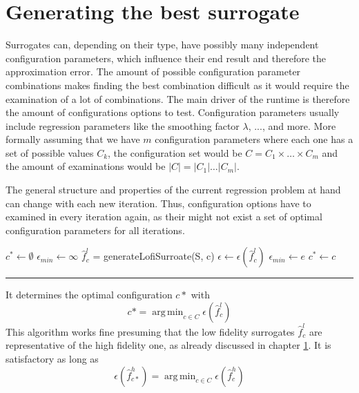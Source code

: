 \documentclass[
  a4paper,  %
  twoside,  %
  bibliography=totoc,
  headsepline,
  cleardoublepage=empty,
  parskip=half,
  draft=false
]{scrbook}
\DeclareMathOperator*{\argmin}{arg\,min}
\newcommand{\delimit}{{\color{charcoal}\noindent\rule{\textwidth}{1pt}}}
\begin{document}
\section{Generating the best surrogate}

Surrogates can, depending on their type, have possibly many independent configuration parameters, which influence their end result and therefore the approximation error.
The amount of possible configuration parameter combinations makes finding the best combination difficult as it would require the examination of a lot of combinations.
The main driver of the runtime is therefore the amount of configurations options to test.
Configuration parameters usually include regression parameters like the smoothing factor $\lambda$, ..., and more.
More formally assuming that we have $m$ configuration parameters where each one has a set of possible values $C_k$, the configuration set would be $C=C_1 \times \dots \times C_m$ and the amount of examinations would be $|C|=|C_1| \dots |C_m|$.

The general structure and properties of the current regression problem at hand can change with each new iteration.
Thus, configuration options have to examined in every iteration again, as their might not exist a set of optimal configuration 
parameters for all iterations.

\begin{mdframed}[style=algstyle,frametitle={\textbf{function} \texttt{generateBestSurroate}{$(S_t, C, \epsilon)$}}]
\normalsize
\vspace{5.5mm}
\begin{algorithmic}[1]
    \State $c^\ast \gets \emptyset$
    \State $\epsilon_{min} \gets \infty$
      \State $\hat{f}_c^l$ = generateLofiSurroate(S, c)
    	\State $\epsilon \gets \epsilon(\hat{f}_c^l)$
    	  \State $\epsilon_{min}\gets e$
    	\State $c^\ast \gets c$
    	\EndIf
    \EndFor
    \State {}
\end{algorithmic}
\vspace{-1.5mm}
\delimit
	\label{alg:bestsur}
\end{mdframed}


It determines the optimal configuration $c*$ with
\begin{equation}
c*=\argmin_{c \in C} \epsilon(\hat{f}_c^l)
\end{equation}
This algorithm works fine presuming that the low fidelity surrogates $\hat{f}_c^l$ are representative of the high fidelity one, as already discussed in chapter \ref{}.
It is satisfactory as long as 
\begin{equation}
\epsilon(\hat{f}_{c*}^h)=\argmin_{c \in C} \epsilon(\hat{f}_c^h)
\end{equation}
\end{document}
